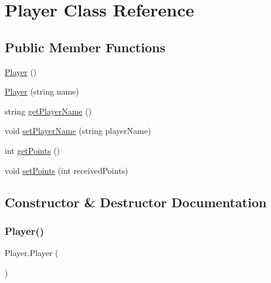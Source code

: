 \hypertarget{classPlayer}{}\section{Player Class Reference}
\label{classPlayer}
\subsection*{Public Member Functions}
\begin{DoxyCompactItemize}
\item 
\hyperlink{classPlayer_a712a726b07cf901c040116d6d0c5cc66}{Player} ()
\item 
\hyperlink{classPlayer_a1e27917f68627cae1ae9d03deb06050e}{Player} (string name)
\item 
string \hyperlink{classPlayer_a0be8a860b0f2f2345bfdb35f598064ae}{get\+Player\+Name} ()
\item 
void \hyperlink{classPlayer_a2c318642869ff9b766a5507d07b78fd3}{set\+Player\+Name} (string player\+Name)
\item 
int \hyperlink{classPlayer_ad0516b90fa518f321798b3113aec363c}{get\+Points} ()
\item 
void \hyperlink{classPlayer_a8d2d50dfbb6e990cdb52a2edaa4edd8a}{set\+Points} (int received\+Points)
\end{DoxyCompactItemize}


\subsection{Constructor \& Destructor Documentation}
\mbox{\label{classPlayer_a712a726b07cf901c040116d6d0c5cc66}} 
\subsubsection{\texorpdfstring{Player()}{Player()}\hspace{0.1cm}{\footnotesize\ttfamily [1/2]}}
{\footnotesize\ttfamily Player.\+Player (\begin{DoxyParamCaption}{ }\end{DoxyParamCaption})\hspace{0.3cm}{\ttfamily [inline]}}

\mbox{\label{classPlayer_a1e27917f68627cae1ae9d03deb06050e}} 
